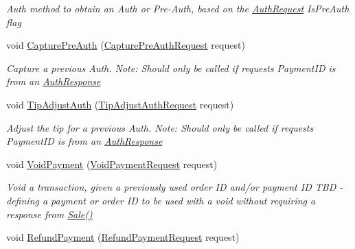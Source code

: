 \begin{DoxyCompactItemize}
\begin{DoxyCompactList}\small\item\em Auth method to obtain an Auth or Pre-\/\+Auth, based on the \hyperlink{classcom_1_1clover_1_1remotepay_1_1sdk_1_1_auth_request}{Auth\+Request} Is\+Pre\+Auth flag \end{DoxyCompactList}\item 
void \hyperlink{interfacecom_1_1clover_1_1remotepay_1_1sdk_1_1_i_clover_connector_a1687202a30277f4ae5dffd73b9311b94}{Capture\+Pre\+Auth} (\hyperlink{classcom_1_1clover_1_1remotepay_1_1sdk_1_1_capture_pre_auth_request}{Capture\+Pre\+Auth\+Request} request)
\begin{DoxyCompactList}\small\item\em Capture a previous Auth. Note\+: Should only be called if request\textquotesingle{}s Payment\+ID is from an \hyperlink{classcom_1_1clover_1_1remotepay_1_1sdk_1_1_auth_response}{Auth\+Response} \end{DoxyCompactList}\item 
void \hyperlink{interfacecom_1_1clover_1_1remotepay_1_1sdk_1_1_i_clover_connector_a815c8be2012ebda06247c059771717cc}{Tip\+Adjust\+Auth} (\hyperlink{classcom_1_1clover_1_1remotepay_1_1sdk_1_1_tip_adjust_auth_request}{Tip\+Adjust\+Auth\+Request} request)
\begin{DoxyCompactList}\small\item\em Adjust the tip for a previous Auth. Note\+: Should only be called if request\textquotesingle{}s Payment\+ID is from an \hyperlink{classcom_1_1clover_1_1remotepay_1_1sdk_1_1_auth_response}{Auth\+Response} \end{DoxyCompactList}\item 
void \hyperlink{interfacecom_1_1clover_1_1remotepay_1_1sdk_1_1_i_clover_connector_af35e223ba760d0a6d61c67895c619997}{Void\+Payment} (\hyperlink{classcom_1_1clover_1_1remotepay_1_1sdk_1_1_void_payment_request}{Void\+Payment\+Request} request)
\begin{DoxyCompactList}\small\item\em Void a transaction, given a previously used order ID and/or payment ID T\+BD -\/ defining a payment or order ID to be used with a void without requiring a response from \hyperlink{interfacecom_1_1clover_1_1remotepay_1_1sdk_1_1_i_clover_connector_acc92394e6902137c559510e498e78529}{Sale()} \end{DoxyCompactList}\item 
void \hyperlink{interfacecom_1_1clover_1_1remotepay_1_1sdk_1_1_i_clover_connector_aaa44684c7bf2c04b88ead61034c7c273}{Refund\+Payment} (\hyperlink{classcom_1_1clover_1_1remotepay_1_1sdk_1_1_refund_payment_request}{Refund\+Payment\+Request} request)

\end{DoxyCompactItemize}
